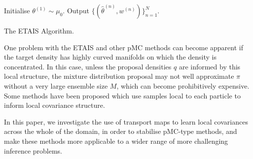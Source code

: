 \documentclass[final]{siamltex}
\begin{document}
\begin{table}[!h]
\centering
\begin{algorithm}[H]
\DontPrintSemicolon
\BlankLine
	Initialise $\theta^{(1)} \sim \mu_0$.\;
	Output $\{(\hat{\theta}^{(n)},w^{(n)})\}_{n=1}^N$.
\caption{The ETAIS Algorithm.\label{alg:ETAIS}}
\end{algorithm}
\end{table}

One problem with the ETAIS and other pMC methods can become apparent if
the target density has highly curved manifolds on which the density is
concentrated. In this
case, unless the proposal densities $q$ are informed by this local
structure, the mixture distribution proposal may not well approximate
$\pi$ without a very large ensemble size $M$, which can become
prohibitively expensive. Some methods have been
proposed\cite{douc2007minimum}
which use samples local to each particle to inform local covariance
structure.

In this paper, we investigate the use of transport maps to learn local
covariances across the whole of the domain, in order to stabilise
pMC-type methods, and make these methods more applicable to a wider
range of more challenging inference problems.
\end{document}
